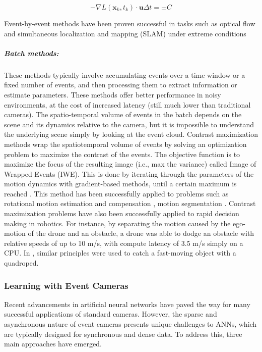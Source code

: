 \documentclass{article}
\begin{document}
\begin{equation}\label{eq:moving_edges_event}
    -\nabla L(\textbf{x}_k,t_k) \cdot \textbf{u}\Delta t = \pm C    
\end{equation}

Event-by-event methods have been proven successful in tasks such as optical flow and simultaneous localization and mapping (SLAM) under extreme conditions \cite{vidalUltimateSLAMCombining2018, cuadradoOpticalFlowEstimation2023,gehrigERAFTDenseOptical2021, sunAutonomousQuadrotorFlight2021}

\subparagraph{Batch methods:} These methods typically involve accumulating events over a time window or a fixed number of events, and then processing them to extract information or estimate parameters. These methods offer better performance in noisy environments, at the cost of increased latency (still much lower than traditional cameras). The spatio-temporal volume of events in the batch depends on the scene and its dynamics relative to the camera, but it is impossible to understand the underlying scene simply by looking at the event cloud. Contrast maximization methods wrap the spatiotemporal volume of events by solving an optimization problem to maximize the contrast of the events. The objective function is to maximize the focus of the resulting image (i.e., max the variance) called Image of Wrapped Events (IWE). This is done by iterating through the parameters of the motion dynamics with gradient-based methods, until a certain maximum is reached \cite{gallegoUnifyingContrastMaximization2018a, gallegoEventbasedVisionSurvey2022, gallegoFocusAllYou2019}. This method has been successfully applied to problems such as rotational motion estimation and compensation \cite{gallegoAccurateAngularVelocity2017,xingEROAMEventbasedCamera2024}, motion segmentation \cite{stoffregenEventBasedMotionSegmentation2019}. Contrast maximization problems have also been successfully applied to rapid decision making in robotics. For instance, by separating the motion caused by the ego-motion of the drone and an obstacle, a drone was able to dodge an obstacle with relative speeds of up to 10 m/s, with compute latency of 3.5 m/s simply on a CPU. In \cite{forraiEventbasedAgileObject2023}, similar principles were used to catch a fast-moving object with a quadroped.

\subsubsection{Learning with Event Cameras} Recent advancements in artificial neural networks have paved the way for many successful applications of standard cameras. However, the sparse and asynchronous nature of event cameras presents unique challenges to ANNs, which are typically designed for synchronous and dense data. To address this, three main approaches have emerged.
\end{document}
